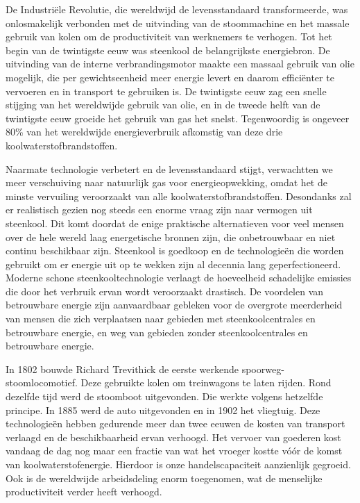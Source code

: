 De Industriële Revolutie, die wereldwijd de levensstandaard transformeerde, was onlosmakelijk verbonden met de uitvinding van de stoommachine en het massale gebruik van kolen om de productiviteit van werknemers te verhogen. Tot het begin van de twintigste eeuw was steenkool de belangrijkste energiebron. De uitvinding van de interne verbrandingsmotor maakte een massaal gebruik van olie mogelijk, die per gewichtseenheid meer energie levert en daarom efficiënter te vervoeren en in transport te gebruiken is. De twintigste eeuw zag een snelle stijging van het wereldwijde gebruik van olie, en in de tweede helft van de twintigste eeuw groeide het gebruik van gas het snelst. Tegenwoordig is ongeveer 80\% van het wereldwijde energieverbruik afkomstig van deze drie koolwaterstofbrandstoffen.

Naarmate technologie verbetert en de levensstandaard stijgt, verwachtten we meer verschuiving naar natuurlijk gas voor energieopwekking, omdat het de minste vervuiling veroorzaakt van alle koolwaterstofbrandstoffen. Desondanks zal er realistisch gezien nog steeds een enorme vraag zijn naar vermogen uit steenkool. Dit komt doordat de enige praktische alternatieven voor veel mensen over de hele wereld laag energetische bronnen zijn, die onbetrouwbaar en niet continu beschikbaar zijn. Steenkool is goedkoop en de technologieën die worden gebruikt om er energie uit op te wekken zijn al decennia lang geperfectioneerd. Moderne schone steenkooltechnologie verlaagt de hoeveelheid schadelijke emissies die door het verbruik ervan wordt veroorzaakt drastisch. De voordelen van betrouwbare energie zijn aanvaardbaar gebleken voor de overgrote meerderheid van mensen die zich verplaatsen naar gebieden met steenkoolcentrales en betrouwbare energie, en weg van gebieden zonder steenkoolcentrales en betrouwbare energie.

In 1802 bouwde Richard Trevithick de eerste werkende spoorweg-stoom\-loco\-motief. Deze gebruikte kolen om treinwagons te laten rijden. Rond dezelfde tijd werd de stoomboot uitgevonden. Die werkte volgens hetzelfde principe. In 1885 werd de auto uitgevonden en in 1902 het vliegtuig. Deze technologieën hebben gedurende meer dan twee eeuwen de kosten van transport verlaagd en de beschikbaarheid ervan verhoogd. Het vervoer van goederen kost vandaag de dag nog maar een fractie van wat het vroeger kostte vóór de komst van koolwaterstofenergie. Hierdoor is onze handelscapaciteit aanzienlijk gegroeid. Ook is de wereldwijde arbeidsdeling enorm toegenomen, wat de menselijke productiviteit verder heeft verhoogd.

